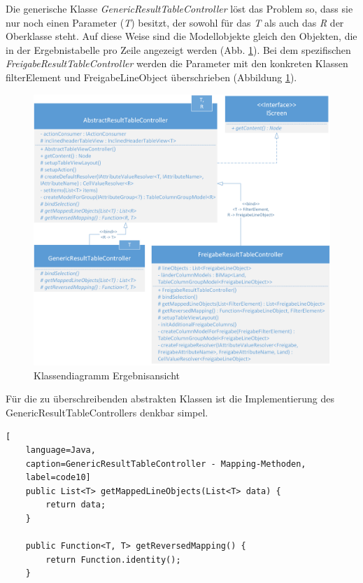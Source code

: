 Die generische Klasse \textit{GenericResultTableController} löst das Problem so, dass sie nur noch einen Parameter (\textit{T}) besitzt, der sowohl für das \textit{T} als auch das \textit{R} der Oberklasse steht. Auf diese Weise sind die Modellobjekte gleich den Objekten, die in der Ergebnistabelle pro Zeile angezeigt werden (Abb. \ref{fig:tabelle4}). Bei dem spezifischen \textit{FreigabeResultTableController} werden die Parameter mit den konkreten Klassen \gls{filterElement} und FreigabeLineObject überschrieben (Abbildung \ref{fig:tabelle4}).

\begin{figure}[H]
 \centering
 \includegraphics[width=1.0\textwidth]{grafiken/Class_ResultTable.png}
 \caption{Klassendiagramm Ergebnisansicht}
 \label{fig:tabelle4}
\end{figure}

Für die zu überschreibenden abstrakten Klassen ist die Implementierung des GenericResultTableControllers denkbar simpel.

\begin{lstlisting}[
    language=Java,
    caption=GenericResultTableController - Mapping-Methoden,
    label=code10]
	public List<T> getMappedLineObjects(List<T> data) {
		return data;
	}

	public Function<T, T> getReversedMapping() {
		return Function.identity();
	}
\end{lstlisting}


